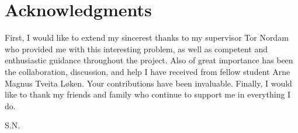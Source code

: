 \section*{Acknowledgments}

First, I would like to extend my sincerest thanks to my supervisor Tor Nordam who provided me with this interesting problem, as well as competent and enthusiastic guidance throughout the project. Also of great importance has been the collaboration, discussion, and help I have received from fellow student Arne Magnus Tveita Løken. Your contributions have been invaluable. Finally, I would like to thank my friends and family who continue to support me in everything I do.

\begin{flushright}
S.N.\\[1pc]
\end{flushright}


